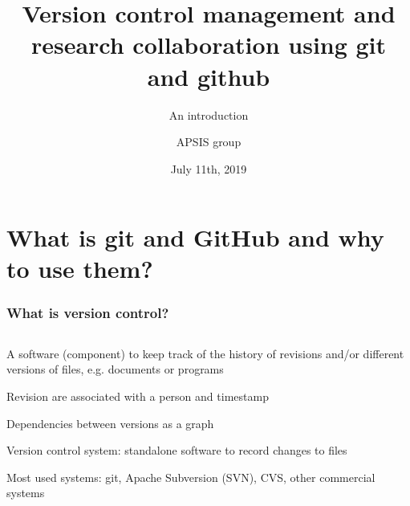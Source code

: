 \documentclass{beamer}
\title{Version control management and research collaboration using git and github}
\subtitle{An introduction}
\author{APSIS group}
\institute{MCC Berlin}
\date{July 11th, 2019}
\begin{document}
\maketitle


\section{What is git and GitHub and why to use them?}

\begin{frame}
\frametitle{What is version control?}


\begin{columns}
	\begin{column}{0.75\linewidth}

A software (component) to keep track of the history of revisions and/or different versions of files, e.g. documents or programs

\bigskip

Revision are associated with a person and timestamp

\bigskip

Dependencies between versions as a graph

\bigskip

Version control system: standalone software to record changes to files

\bigskip

Most used systems: git, Apache Subversion (SVN), CVS, other commercial systems


\end{column}
\end{columns}
\end{frame}
\end{document}
